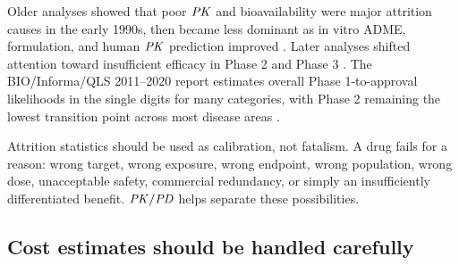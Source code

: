 \documentclass[a4paper]{article}
\newcommand{\PK}{\ensuremath{\pksym{PK}}}
\newcommand{\PKPD}{\ensuremath{\pksym{PK}/\pksym{PD}}}
\begin{document}
Older analyses showed that poor \PK{} and bioavailability were major attrition causes in the early 1990s, then became less dominant as in vitro ADME, formulation, and human \PK{} prediction improved \cite{kola2004attrition}. Later analyses shifted attention toward insufficient efficacy in Phase 2 and Phase 3 \cite{arrowsmith2011phase2,harrison2016phase}. The BIO/Informa/QLS 2011--2020 report estimates overall Phase 1-to-approval likelihoods in the single digits for many categories, with Phase 2 remaining the lowest transition point across most disease areas \cite{bio2021success}.

\begin{center}
\end{center}

\begin{warning}
  Attrition statistics should be used as calibration, not fatalism. A drug fails for a reason: wrong target, wrong exposure, wrong endpoint, wrong population, wrong dose, unacceptable safety, commercial redundancy, or simply an insufficiently differentiated benefit. \PKPD{} helps separate these possibilities.
\end{warning}

\subsection{Cost estimates should be handled carefully}
\end{document}
